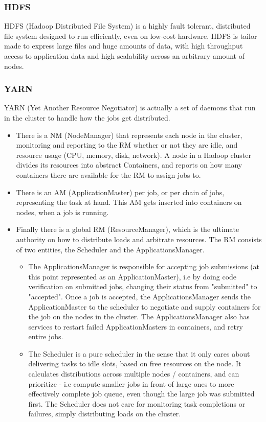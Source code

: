 \documentclass[a4paper,english]{report}
\begin{document}
				\subsubsection{HDFS}
					HDFS (Hadoop Distributed File System) is a highly fault tolerant, distributed file system designed to run efficiently, even on low-cost hardware. HDFS is tailor made to express large files and huge amounts of data, with high throughput access to application data and high scalability across an arbitrary amount of nodes.
				
				\subsubsection{YARN}
					YARN (Yet Another Resource Negotiator) is actually a set of daemons that run in the cluster to handle how the jobs get distributed. 
					\begin{itemize}
						\item There is a NM (NodeManager) that represents each node in the cluster, monitoring and reporting to the RM whether or not they are idle, and resource usage (CPU, memory, disk, network). A node in a Hadoop cluster divides its resources into abstract Containers, and reports on how many containers there are available for the RM to assign jobs to.
						\item There is an AM (ApplicationMaster) per job, or per chain of jobs, representing the task at hand. This AM gets inserted into containers on nodes, when a job is running.
						\item Finally there is a global RM (ResourceManager), which is the ultimate authority on how to distribute loads and arbitrate resources. The RM consists of two entities, the Scheduler and the ApplicationsManager.
							\begin{itemize}	
								\item The ApplicationsManager is responsible for accepting job submissions (at this point represented as an ApplicationMaster), i.e by doing code verification on submitted jobs, changing their status from "submitted" to "accepted". Once a job is accepted, the ApplicationsManager sends the ApplicationMaster to the scheduler to negotiate and supply containers for the job on the nodes in the cluster. The ApplicationsManager also has services to restart failed ApplicationMasters in containers, and retry entire jobs.
								\item The Scheduler is a pure scheduler in the sense that it only cares about delivering tasks to idle slots, based on free resources on the node. It calculates distributions across multiple nodes / containers, and can prioritize - i.e compute smaller jobs in front of large ones to more effectively complete job queue, even though the large job was submitted first. The Scheduler does not care for monitoring task completions or failures, simply distributing loads on the cluster.
							\end{itemize}
					\end{itemize}
\end{document}
